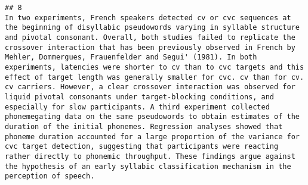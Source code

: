 \documentclass[
  english,
  man]{apa6}
\begin{document}
\begin{verbatim}
## 8                                                                                                                                                                                                                                                                                                                                                                                                                                                                                                                                                                                                                                                                                                                                                                                                                                                                                                                                                                                                                                                                                                                                                                                                                                                                                                                                                                                                                                                                                                                            In two experiments, French speakers detected cv or cvc sequences at the beginning of disyllabic pseudowords varying in syllable structure and pivotal consonant. Overall, both studies failed to replicate the crossover interaction that has been previously observed in French by Mehler, Dommergues, Frauenfelder and Segui' (1981). In both experiments, latencies were shorter to cv than to cvc targets and this effect of target length was generally smaller for cvc. cv than for cv. cv carriers. However, a clear crossover interaction was observed for liquid pivotal consonants under target-blocking conditions, and especially for slow participants. A third experiment collected phonemegating data on the same pseudowords to obtain estimates of the duration of the initial phonemes. Regression analyses showed that phoneme duration accounted for a large proportion of the variance for cvc target detection, suggesting that participants were reacting rather directly to phonemic throughput. These findings argue against the hypothesis of an early syllabic classification mechanism in the perception of speech.

\end{verbatim}
\end{document}
